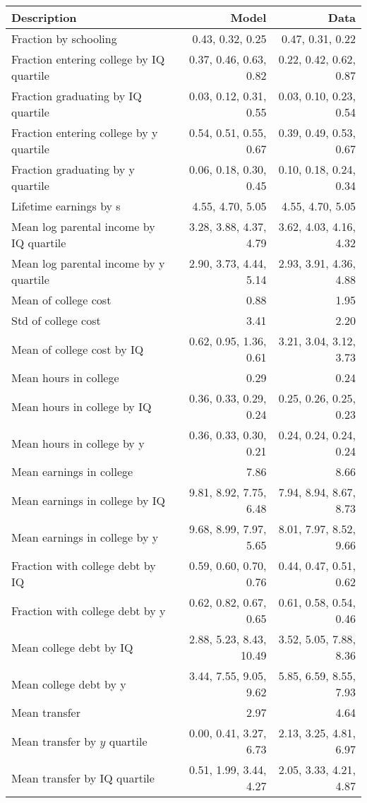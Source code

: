 \begin{tabular}{lrr}
\hline
Description & Model  & Data  \\
\hline
Fraction by schooling & 0.43, 0.32, 0.25  & 0.47, 0.31, 0.22  \\
Fraction entering college by IQ quartile & 0.37, 0.46, 0.63, 0.82  & 0.22, 0.42, 0.62, 0.87  \\
Fraction graduating by IQ quartile & 0.03, 0.12, 0.31, 0.55  & 0.03, 0.10, 0.23, 0.54  \\
Fraction entering college by y quartile & 0.54, 0.51, 0.55, 0.67  & 0.39, 0.49, 0.53, 0.67  \\
Fraction graduating by y quartile & 0.06, 0.18, 0.30, 0.45  & 0.10, 0.18, 0.24, 0.34  \\
Lifetime earnings by s & 4.55, 4.70, 5.05  & 4.55, 4.70, 5.05  \\
Mean log parental income by IQ quartile & 3.28, 3.88, 4.37, 4.79  & 3.62, 4.03, 4.16, 4.32  \\
Mean log parental income by y quartile & 2.90, 3.73, 4.44, 5.14  & 2.93, 3.91, 4.36, 4.88  \\
Mean of college cost & 0.88  & 1.95  \\
Std of college cost & 3.41  & 2.20  \\
Mean of college cost by IQ & 0.62, 0.95, 1.36, 0.61  & 3.21, 3.04, 3.12, 3.73  \\
Mean hours in college & 0.29  & 0.24  \\
Mean hours in college by IQ & 0.36, 0.33, 0.29, 0.24  & 0.25, 0.26, 0.25, 0.23  \\
Mean hours in college by y & 0.36, 0.33, 0.30, 0.21  & 0.24, 0.24, 0.24, 0.24  \\
Mean earnings in college & 7.86  & 8.66  \\
Mean earnings in college by IQ & 9.81, 8.92, 7.75, 6.48  & 7.94, 8.94, 8.67, 8.73  \\
Mean earnings in college by y & 9.68, 8.99, 7.97, 5.65  & 8.01, 7.97, 8.52, 9.66  \\
Fraction with college debt by IQ & 0.59, 0.60, 0.70, 0.76  & 0.44, 0.47, 0.51, 0.62  \\
Fraction with college debt by y & 0.62, 0.82, 0.67, 0.65  & 0.61, 0.58, 0.54, 0.46  \\
Mean college debt by IQ & 2.88, 5.23, 8.43, 10.49  & 3.52, 5.05, 7.88, 8.36  \\
Mean college debt by y & 3.44, 7.55, 9.05, 9.62  & 5.85, 6.59, 8.55, 7.93  \\
Mean transfer & 2.97  & 4.64  \\
Mean transfer by $y$ quartile & 0.00, 0.41, 3.27, 6.73  & 2.13, 3.25, 4.81, 6.97  \\
Mean transfer by IQ quartile & 0.51, 1.99, 3.44, 4.27  & 2.05, 3.33, 4.21, 4.87  \\
\hline
\end{tabular}%
